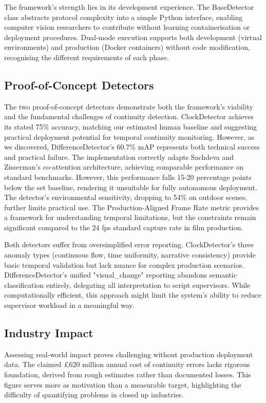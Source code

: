 The framework's strength lies in its development experience. The BaseDetector class abstracts protocol complexity into a simple Python interface, enabling computer vision researchers to contribute without learning containerisation or deployment procedures. Dual-mode execution supports both development (virtual environments) and production (Docker containers) without code modification, recognising the different requirements of each phase.

\subsection{Proof-of-Concept Detectors}
The two proof-of-concept detectors demonstrate both the framework's viability and the fundamental challenges of continuity detection. ClockDetector achieves its stated 75\% accuracy, matching our estimated human baseline and suggesting practical deployment potential for temporal continuity monitoring. However, as we discovered, DifferenceDetector's 60.7\% mAP represents both technical success and practical failure. The implementation correctly adapts Sachdeva and Zisserman's co-attention architecture, achieving comparable performance on standard benchmarks. However, this performance falls 15-20 percentage points below the set baseline, rendering it unsuitable for fully autonomous deployment. The detector's environmental sensitivity, dropping to 54\% on outdoor scenes, further limits practical use. The Production-Aligned Frame Rate metric provides a framework for understanding temporal limitations, but the constraints remain significant compared to the 24 fps standard capture rate in film production.

Both detectors suffer from oversimplified error reporting. ClockDetector's three anomaly types (continuous flow, time uniformity, narrative consistency) provide basic temporal validation but lack nuance for complex production scenarios. DifferenceDetector's unified "visual\_change" reporting abandons semantic classification entirely, delegating all interpretation to script supervisors. While computationally efficient, this approach might limit the system's ability to reduce supervisor workload in a meaningful way.

\subsection{Industry Impact}
Assessing real-world impact proves challenging without production deployment data. The claimed £620 million annual cost of continuity errors lacks rigorous foundation, derived from rough estimates rather than documented losses. This figure serves more as motivation than a measurable target, highlighting the difficulty of quantifying problems in closed up industries.

